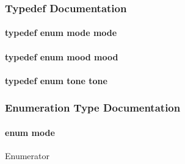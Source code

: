 \subsubsection{Typedef Documentation}
\paragraph[{mode}]{\setlength{\rightskip}{0pt plus 5cm}typedef enum {\bf mode}  {\bf mode}}\label{main_8c_abcec22444f1b2fc64f59764d40244d9f}
\paragraph[{mood}]{\setlength{\rightskip}{0pt plus 5cm}typedef enum {\bf mood}  {\bf mood}}\label{main_8c_a3e304bbd72e3a576384c6e8cdb661eb4}
\paragraph[{tone}]{\setlength{\rightskip}{0pt plus 5cm}typedef enum {\bf tone}  {\bf tone}}\label{main_8c_aac01cecf1f254ffa121e2715527a6a5a}


\subsubsection{Enumeration Type Documentation}
\paragraph[{mode}]{\setlength{\rightskip}{0pt plus 5cm}enum {\bf mode}}\label{main_8c_a1a6b6fb557d8d37d59700faf4e4c9167}
\begin{Desc}
\item[Enumerator]\par
\begin{description}
\item[{\em 
major\label{main_8c_a1a6b6fb557d8d37d59700faf4e4c9167adc8c3476e4d3526d10210987c7131cb5}
}]\item[{\em 
minor\label{main_8c_a1a6b6fb557d8d37d59700faf4e4c9167a252026d6db6e81a42ef18bfd98b45a11}
}]\end{description}
\end{Desc}

